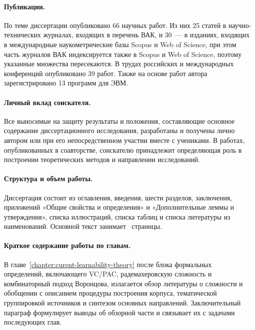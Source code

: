 \paragraph{Публикации.}
По теме диссертации опубликовано 66 научных работ. Из них 25 статей в научно-технических журналах, входящих в перечень ВАК, и 30~--- в изданиях, входящих в международные наукометрические базы Scopus и Web of Science, при этом часть журналов ВАК индексируется также в Scopus и Web of Science, поэтому указанные множества пересекаются. В трудах российских и международных конференций опубликовано 39 работ. Также на основе работ автора зарегистрировано 13 программ для ЭВМ.

\paragraph{Личный вклад соискателя.}
Все выносимые на защиту результаты и положения, составляющие основное содержание диссертационного исследования, разработаны и получены лично автором или при его непосредственном участии вместе с учениками.
В работах, опубликованных в соавторстве, соискателю принадлежит определяющая роль в построении теоретических методов и направлении исследований.

\paragraph{Структура и объем работы.}
Диссертация состоит из оглавления, введения, шести разделов, заключения, приложений «Общие свойства и определения» и «Дополнительные леммы и утверждения», списка иллюстраций, списка таблиц и списка литературы из~ наименований. Основной текст занимает~\pageref{LastPage} страницы.

\paragraph{Краткое содержание работы по главам.}

В главе~\ref{chapter:curent-learnability-theory} после блока формальных определений, включающего VC/PAC, радемахеровскую сложность и комбинаторный подход Воронцова, излагается обзор литературы о сложности и обобщении с описанием процедуры построения корпуса, тематической группировкой источников и синтезом основных направлений. Заключительный параграф формулирует выводы об обзорной части и связывает их с задачами последующих глав.

